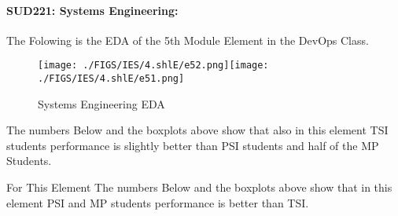 \documentclass[12pt]{extreport}
\begin{document}

\paragraph{\large SUD221: Systems Engineering:\\
}  
The Folowing is the EDA of the 5th Module Element in the DevOps Class.
\begin{figure}[H]
	\centering
	\texttt{[image: ./FIGS/IES/4.shlE/e52.png]}\texttt{[image: ./FIGS/IES/4.shlE/e51.png]}
	\caption{Systems Engineering EDA}
	\label{fig:48}
\end{figure}

The numbers Below and the boxplots above show that also in this element  TSI students performance is slightly better than PSI students and half of the MP Students.

For This Element The numbers Below and the boxplots above show that in this element  PSI and MP students performance is  better than TSI.


\begin{comment}
\subparagraph{Interpretation of the Box-plots:}
For This Element 

\begin{enumerate}	
	\item The MP Class Box-Plot:
	\begin{enumerate}
		\item MAX = a {} {} {} {} {} {} {} {} UQ = b {} {} {} {} {} {} {} {} Median = c
		\item LQ = d {} {} {} {} {} {} {} {}  MIN =	l {} {} {} {} {} {} {} {}  IQR = e - f = g
	\end{enumerate}
	\item The PSI Class Box-Plot:
	\begin{enumerate}
		\item MAX = a {} {} {} {} {} {} {} {} UQ = b {} {} {} {} {} {} {} {} Median = c
		\item LQ = d {} {} {} {} {} {} {} {}  MIN =	e {} {} {} {} {} {} {} {} IQR = f - g = h	
	\end{enumerate}
	\item The TSI Class Box-Plot:
	\begin{enumerate}
		\item MAX = a {} {} {} {} {} {} {} {} UQ = b {} {} {} {} {} {} {} {} Median = c
		\item LQ = d {} {} {} {} {} {} {} {} MIN = e {} {} {} {} {} {} {} {} IQR = f - g = h	
	\end{enumerate}
\end{enumerate}



\subparagraph{Interpretation of the histogram:}
This Frequency Distribution is (Skeness) with the following descriptive statistics:
\begin{enumerate}
	\item Mean = 
	\item STD = 
	\item Range = a - b = c
	\item IQR = a-b = c 
\end{enumerate}
\end{comment}
\end{document}
